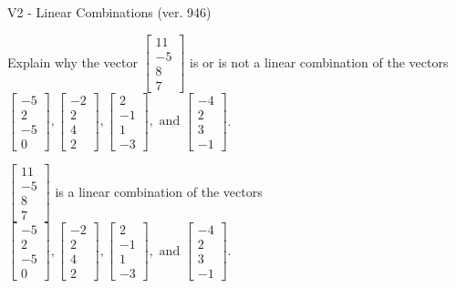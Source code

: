 \begin{exercise}
  \begin{exerciseTitle}V2 - Linear Combinations (ver. 946)\end{exerciseTitle}
  \begin{exerciseStatement}
    Explain why the vector \(\left[\begin{array}{c}
11 \\
-5 \\
8 \\
7
\end{array}\right]\)  is or is not a linear 
	combination of the vectors \(\left[\begin{array}{c}
-5 \\
2 \\
-5 \\
0
\end{array}\right] , \left[\begin{array}{c}
-2 \\
2 \\
4 \\
2
\end{array}\right] , \left[\begin{array}{c}
2 \\
-1 \\
1 \\
-3
\end{array}\right] , \text{ and } \left[\begin{array}{c}
-4 \\
2 \\
3 \\
-1
\end{array}\right]\).
	


  \end{exerciseStatement}
  \begin{exerciseAnswer}
   \(\left[\begin{array}{c}
11 \\
-5 \\
8 \\
7
\end{array}\right]\) 
  	 is  
	a linear combination of the vectors \(\left[\begin{array}{c}
-5 \\
2 \\
-5 \\
0
\end{array}\right] , \left[\begin{array}{c}
-2 \\
2 \\
4 \\
2
\end{array}\right] , \left[\begin{array}{c}
2 \\
-1 \\
1 \\
-3
\end{array}\right] , \text{ and } \left[\begin{array}{c}
-4 \\
2 \\
3 \\
-1
\end{array}\right]\).


\end{exerciseAnswer}
\end{exercise}

